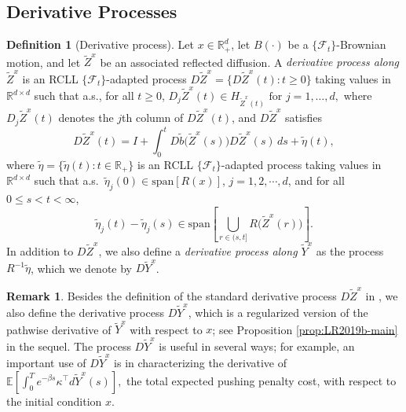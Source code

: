 \documentclass[11pt]{article}
\theoremstyle{definition}
\newtheorem{definition}[assumption]{Definition}
\newtheorem{remark}[assumption]{Remark}
\theoremstyle{plain}
\newcommand{\E}{\mathbb{E}}
\newcommand{\tb}{\tilde{b}}
\begin{document}
\subsection{Derivative Processes}\label{ssec:deriv-proc}

\begin{definition}[Derivative process]
Let $x \in \mathbb{R}_+^d$, let $B(\cdot)$ be a $\{\mathcal{F}_t\}$-Brownian motion, and let $\tilde Z^x$ be an associated reflected diffusion. 
A \emph{derivative process along $\tilde Z^x$} is an RCLL $\{\mathcal{F}_t\}$-adapted process $D\tilde Z^x = \{ D\tilde Z^x(t): t \ge 0 \}$ taking values in $\mathbb{R}^{d\times d}$ such that a.s., for all $t \geq 0$,
\(
D_j\tilde Z^x(t) \in H_{\tilde Z^x(t)} \text{ for } j=1,\dots,d,
\)
where $D_j\tilde Z^x(t)$ denotes the $j$th column of $D\tilde Z^x(t)$, 
and $D\tilde Z^x$ satisfies
\[
D\tilde Z^x(t) = I + \int_0^t D\tb\bigl( \tilde Z^x(s) \bigr) D\tilde Z^x(s)\,ds + \tilde \eta(t),
\]
where $\tilde \eta = \{ \tilde \eta(t) : t \in \mathbb{R}_+ \}$ is an RCLL $\{\mathcal{F}_t\}$-adapted process taking values in $\mathbb{R}^{d\times d}$ such that a.s.\ $\tilde \eta_j(0) \in \text{span}[R(x)]$, $j=1, 2, \cdots, d$, and for all $0 \le s < t < \infty$,
\[
\tilde \eta_j(t) - \tilde \eta_j(s) \in \text{span} \left[ \bigcup_{r \in (s,t]} R\bigl( \tilde Z^x(r) \bigr) \right].
\]
In addition to $D\tilde Z^x$, we also define a {\em derivative process along $\tilde Y^x$} as the process $R^{-1} \tilde \eta$, which we denote by $D\tilde Y^x$.
\end{definition}
\begin{remark}
Besides the definition of the standard derivative process $D\tilde Z^x$ in \cite{LipshutzRamanan2019b}, 
we also define the derivative process $D\tilde Y^x$, which is a regularized version of the pathwise derivative of 
$\tilde Y^x$ with respect to $x$; see Proposition \ref{prop:LR2019b-main} in the sequel. The process $D\tilde Y^x$ is useful in several ways; 
for example, an important use of $D\tilde Y^x$ is in characterizing the derivative of 
\(
\E\left[\int_0^T e^{-\beta s} \kappa^{\top} d\tilde Y^{x}(s) \right],
\)
the total expected pushing penalty cost, with respect to the initial condition $x$.
\end{remark}
\end{document}
